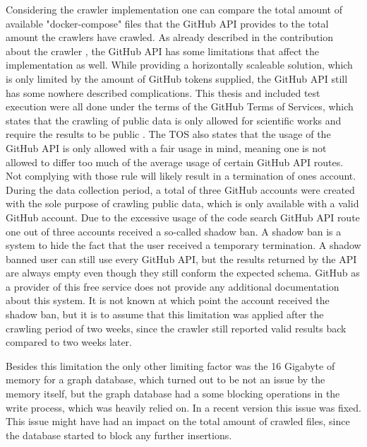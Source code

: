 Considering the crawler implementation one can compare the total amount of available "docker-compose" files that the GitHub API provides to the total amount the crawlers have crawled. As already described in the contribution about the crawler , the GitHub API has some limitations that affect the implementation as well. While providing a horizontally scaleable solution, which is only limited by the amount of GitHub tokens supplied, the GitHub API still has some nowhere described complications. This thesis and included test execution were all done under the terms of the GitHub Terms of Services, which states that the crawling of public data is only allowed for scientific works and require the results to be public . The TOS also states that the usage of the GitHub API is only allowed with a fair usage in mind, meaning one is not allowed to differ too much of the average usage of certain GitHub API routes. Not complying with those rule will likely result in a termination of ones account. During the data collection period, a total of three GitHub accounts were created with the sole purpose of crawling public data, which is only available with a valid GitHub account. Due to the excessive usage of the code search GitHub API route one out of three accounts received a so-called shadow ban. A shadow ban is a system to hide the fact that the user received a temporary termination. A shadow banned user can still use every GitHub API, but the results returned by the API are always empty even though they still conform the expected schema. GitHub as a provider of this free service does not provide any additional documentation about this system. It is not known at which point the account received the shadow ban, but it is to assume that this limitation was applied after the crawling period of two weeks, since the crawler still reported valid results back compared to two weeks later.

Besides this limitation the only other limiting factor was the 16 Gigabyte of memory for a graph database, which turned out to be not an issue by the memory itself, but the graph database had a some blocking operations in the write process, which was heavily relied on. In a recent version this issue was fixed. This issue might have had an impact on the total amount of crawled files, since the database started to block any further insertions. 


